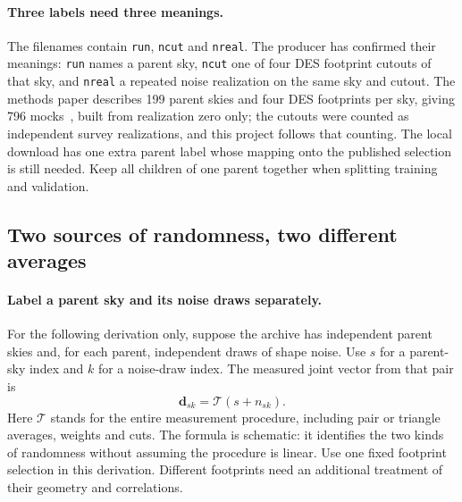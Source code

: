\documentclass[11pt]{article}
\begin{document}
\paragraph{Three labels need three meanings.}
The filenames contain \texttt{run}, \texttt{ncut} and \texttt{nreal}.
The producer has confirmed their meanings: \texttt{run} names a parent
sky, \texttt{ncut} one of four DES footprint cutouts of that sky, and
\texttt{nreal} a repeated noise realization on the same sky and cutout.
The methods paper describes 199 parent skies and four DES footprints per
sky, giving 796 mocks~\cite{gomes}, built from realization zero only;
the cutouts were counted as independent survey realizations, and this
project follows that counting. The local download has one extra parent
label whose mapping onto the published selection is still needed. Keep
all children of one parent together when splitting training and
validation.

\subsection{Two sources of randomness, two different averages}
\paragraph{Label a parent sky and its noise draws separately.}
For the following derivation only, suppose the archive has independent
parent skies and, for each parent, independent draws of shape noise.
Use $s$ for a parent-sky index and $k$ for a noise-draw index. The measured
joint vector from that pair is
\begin{equation}
 \boldsymbol d_{sk}=\mathcal T(s+n_{sk}).
\end{equation}
Here $\mathcal T$ stands for the entire measurement procedure, including
pair or triangle averages, weights and cuts. The formula is schematic:
it identifies the two kinds of randomness without assuming the procedure
is linear. Use one fixed footprint selection in this derivation. Different
footprints need an additional treatment of their geometry and correlations.
\end{document}
